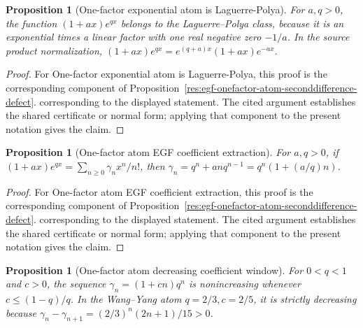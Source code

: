 \documentclass[11pt]{article}
\numberwithin{equation}{section}
\newtheorem{proposition}[theorem]{Proposition}
\theoremstyle{definition}
\theoremstyle{remark}
\newcommand{\1}{\mathbf 1}
\begin{document}
\begin{proposition}[One-factor exponential atom is Laguerre-Polya]
\label{res:lp-onefactor-exponential-atom}
For \(a,q>0\), the function \((1+a x)e^{q x}\) belongs to the Laguerre--Polya class, because it is an exponential times a linear factor with one real negative zero \(-1/a\). In the source product normalization, \((1+a x)e^{q x}=e^{(q+a)x}(1+a x)e^{-a x}\).
\end{proposition}

\begin{proof}
For One-factor exponential atom is Laguerre-Polya, this proof is the corresponding component of Proposition~\ref{res:egf-onefactor-atom-seconddifference-defect}.  corresponding to the displayed statement.  The cited argument establishes the shared certificate or normal form; applying that component to the present notation gives the claim.
\end{proof}

\begin{proposition}[One-factor atom EGF coefficient extraction]
\label{res:egf-onefactor-atom-coefficient-extraction}
For \(a,q>0\), if \((1+a x)e^{q x}=\sum_{n\ge0}\gamma_n x^n/n!\), then \(\gamma_n=q^n+a n q^{n-1}=q^n(1+(a/q)n)\).
\end{proposition}

\begin{proof}
For One-factor atom EGF coefficient extraction, this proof is the corresponding component of Proposition~\ref{res:egf-onefactor-atom-seconddifference-defect}.  corresponding to the displayed statement.  The cited argument establishes the shared certificate or normal form; applying that component to the present notation gives the claim.
\end{proof}

\begin{proposition}[One-factor atom decreasing coefficient window]
\label{res:egf-onefactor-atom-decreasing-window}
For \(0<q<1\) and \(c>0\), the sequence \(\gamma_n=(1+c n)q^n\) is nonincreasing whenever \(c\le(1-q)/q\). In the Wang--Yang atom \(q=2/3,c=2/5\), it is strictly decreasing because \(\gamma_n-\gamma_{n+1}=(2/3)^n(2n+1)/15>0\).
\end{proposition}
\end{document}
